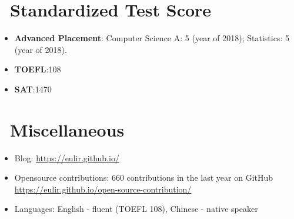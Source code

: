 \documentclass{resume}
\begin{document}
\section{\faUsers\ Standardized Test Score}
\begin{itemize}[parsep=0.5ex]
  \item \textbf{Advanced Placement}: Computer Science A: 5 (year of 2018); Statistics: 5 (year of 2018).
  \item \textbf{TOEFL}:108
  \item \textbf{SAT}:1470
\end{itemize}

\section{\faInfo\ Miscellaneous}
\begin{itemize}[parsep=0.5ex]
  \item Blog: \url{https://eulir.github.io/}
  \item Opensource contributions: 660 contributions in the last year on GitHub \url{https://eulir.github.io/open-source-contribution/} 
  \item Languages: English - fluent (TOEFL 108), Chinese - native speaker
\end{itemize}
\end{document}
